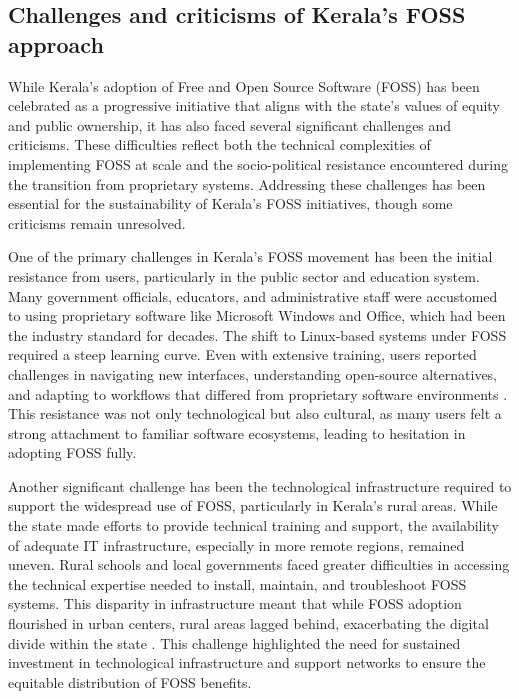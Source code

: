 \begin{refsection}
\subsection{Challenges and criticisms of Kerala's FOSS approach}

While Kerala’s adoption of Free and Open Source Software (FOSS) has been celebrated as a progressive initiative that aligns with the state’s values of equity and public ownership, it has also faced several significant challenges and criticisms. These difficulties reflect both the technical complexities of implementing FOSS at scale and the socio-political resistance encountered during the transition from proprietary systems. Addressing these challenges has been essential for the sustainability of Kerala’s FOSS initiatives, though some criticisms remain unresolved.

One of the primary challenges in Kerala’s FOSS movement has been the initial resistance from users, particularly in the public sector and education system. Many government officials, educators, and administrative staff were accustomed to using proprietary software like Microsoft Windows and Office, which had been the industry standard for decades. The shift to Linux-based systems under FOSS required a steep learning curve. Even with extensive training, users reported challenges in navigating new interfaces, understanding open-source alternatives, and adapting to workflows that differed from proprietary software environments \cite[pp.~156-159]{palackal2007information}. This resistance was not only technological but also cultural, as many users felt a strong attachment to familiar software ecosystems, leading to hesitation in adopting FOSS fully.

Another significant challenge has been the technological infrastructure required to support the widespread use of FOSS, particularly in Kerala's rural areas. While the state made efforts to provide technical training and support, the availability of adequate IT infrastructure, especially in more remote regions, remained uneven. Rural schools and local governments faced greater difficulties in accessing the technical expertise needed to install, maintain, and troubleshoot FOSS systems. This disparity in infrastructure meant that while FOSS adoption flourished in urban centers, rural areas lagged behind, exacerbating the digital divide within the state \cite[pp.~45-47]{isaac2000local}. This challenge highlighted the need for sustained investment in technological infrastructure and support networks to ensure the equitable distribution of FOSS benefits.


\end{refsection}
